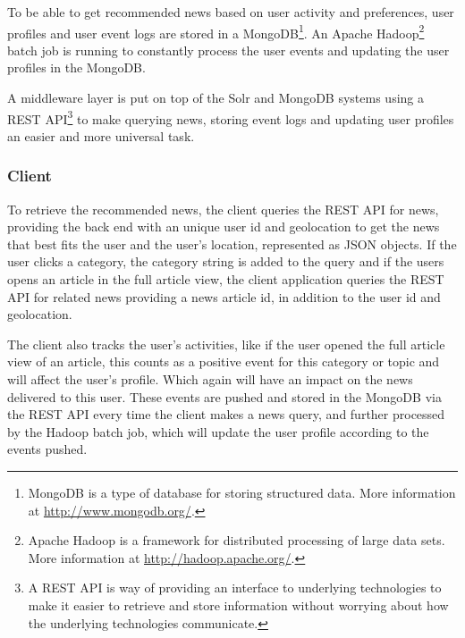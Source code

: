To be able to get recommended news based on user activity and preferences, user profiles and user event logs are stored in a MongoDB\footnote{MongoDB is a type of database for storing structured data. More information at \url{http://www.mongodb.org/}.}. An Apache Hadoop\footnote{Apache Hadoop is a framework for distributed processing of large data sets. More information at \url{http://hadoop.apache.org/}.} batch job is running to constantly process the user events and updating the user profiles in the MongoDB.

A middleware layer is put on top of the Solr and MongoDB systems using a REST API\footnote{A REST API is way of providing an interface to underlying technologies to make it easier to retrieve and store information without worrying about how the underlying technologies communicate.} to make querying news, storing event logs and updating user profiles an easier and more universal task.

\subsubsection{Client}
To retrieve the recommended news, the client queries the REST API for news, providing the back end with an unique user id and geolocation to get the news that best fits the user and the user's location, represented as JSON objects. If the user clicks a category, the category string is added to the query and if the users opens an article in the full article view, the client application queries the REST API for related news providing a news article id, in addition to the user id and geolocation.

The client also tracks the user's activities, like if the user opened the full article view of an article, this counts as a positive event for this category or topic and will affect the user's profile. Which again will have an impact on the news delivered to this user. These events are pushed and stored in the MongoDB via the REST API every time the client makes a news query, and further processed by the Hadoop batch job, which will update the user profile according to the events pushed.

